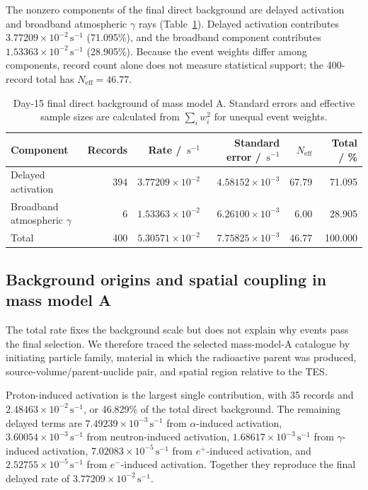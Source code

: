 \documentclass[11pt]{article}
\newcommand{\cps}{\ensuremath{\,\mathrm{s^{-1}}}}
\begin{document}
The nonzero components of the final direct background are delayed activation
and broadband atmospheric $\gamma$ rays
(Table~\ref{tab:reference_background_budget}). Delayed activation contributes
$3.77209\times10^{-2}\cps$ (71.095\%), and the broadband component contributes
$1.53363\times10^{-2}\cps$ (28.905\%). Because the event weights differ among
components, record count alone does not measure statistical support; the
400-record total has $N_{\mathrm{eff}}=46.77$.

\begin{table}[H]
\centering
\caption{Day-15 final direct background of mass model A. Standard errors and effective sample sizes are calculated from $\sum_i w_i^2$ for unequal event weights.}
\label{tab:reference_background_budget}
\footnotesize
\begin{tabular}{lrrrrr}
\toprule
Component & Records & Rate / $\cps$ & Standard error / $\cps$ & $N_{\mathrm{eff}}$ & Total / \% \\
\midrule
Delayed activation & 394 & $3.77209\times10^{-2}$ & $4.58152\times10^{-3}$ & 67.79 & 71.095 \\
Broadband atmospheric $\gamma$ & 6 & $1.53363\times10^{-2}$ & $6.26100\times10^{-3}$ & 6.00 & 28.905 \\
\midrule
Total & 400 & $5.30571\times10^{-2}$ & $7.75825\times10^{-3}$ & 46.77 & 100.000 \\
\bottomrule
\end{tabular}
\end{table}

\subsection{Background origins and spatial coupling in mass model A}
\label{subsec:mass_model_a_origins}

The total rate fixes the background scale but does not explain why events pass the final selection. We therefore traced the selected mass-model-A catalogue by initiating particle family, material in which the radioactive parent was produced, source-volume/parent-nuclide pair, and spatial region relative to the TES.

Proton-induced activation is the largest single contribution, with 35 records and $2.48463\times10^{-2}\cps$, or 46.829\% of the total direct background. The remaining delayed terms are $7.49239\times10^{-3}\cps$ from $\alpha$-induced activation, $3.60054\times10^{-3}\cps$ from neutron-induced activation, $1.68617\times10^{-3}\cps$ from $\gamma$-induced activation, $7.02083\times10^{-5}\cps$ from $e^+$-induced activation, and $2.52755\times10^{-5}\cps$ from $e^-$-induced activation. Together they reproduce the final delayed rate of $3.77209\times10^{-2}\cps$.
\end{document}
